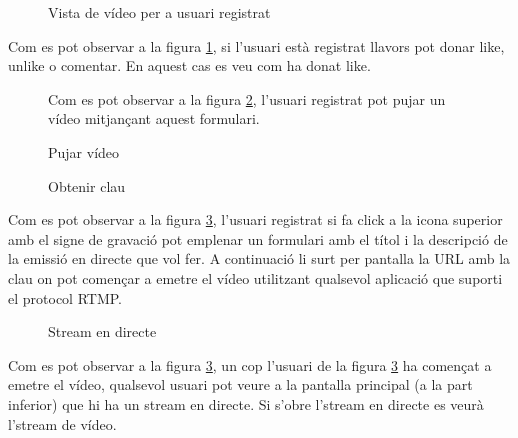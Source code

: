 \documentclass[12pt, titlepage]{article}
\begin{document}
\begin{figure}[H]
\begin{center}
\end{center}
\caption{Vista de vídeo per a usuari registrat}
\label{videoFingerUp}
\end{figure}
Com es pot observar a la figura \ref{videoFingerUp}, si l'usuari està registrat llavors pot donar like, unlike o comentar.
En aquest cas es veu com ha donat like.





\begin{figure}[H]
\begin{center}
\end{center}
\caption{Pujar vídeo}
\label{upload}
Com es pot observar a la figura \ref{upload}, l'usuari registrat pot pujar un
vídeo mitjançant aquest formulari.
\end{figure}





\begin{figure}[H]
\begin{center}
\end{center}
\caption{Obtenir clau}
\label{getKey2}
\end{figure}
Com es pot observar a la figura \ref{getKey2}, l'usuari registrat si fa click a
la icona superior amb el signe de gravació pot emplenar un formulari amb el
títol i la descripció de la emissió en directe que vol fer. A continuació li surt
per pantalla la URL amb la clau on pot començar a emetre el vídeo utilitzant
qualsevol aplicació que suporti el protocol RTMP.



\begin{figure}[H]
\begin{center}
\end{center}
\caption{Stream en directe}
\label{afterKey}
\end{figure}
Com es pot observar a la figura \ref{getKey2}, un cop l'usuari de la figura
\ref{getKey2} ha començat a emetre el vídeo, qualsevol usuari pot veure a la
pantalla principal (a la part inferior) que hi ha un stream en directe. Si s'obre
l'stream en directe es veurà l'stream de vídeo.
\end{document}
